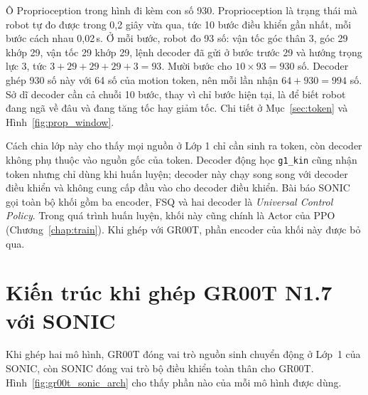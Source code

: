 \documentclass[12pt,a4paper,oneside]{report}
\newcommand{\code}[1]{\texttt{#1}}
\begin{document}
\begin{itemize}
\smallskip
Ô Proprioception trong hình đi kèm con số 930. Proprioception là trạng thái mà robot tự đo được trong 0,2 giây vừa qua, tức 10 bước điều khiển gần nhất, mỗi bước cách nhau 0,02\,s. Ở mỗi bước, robot đo 93 số: vận tốc góc thân 3, góc 29 khớp 29, vận tốc 29 khớp 29, lệnh decoder đã gửi ở bước trước 29 và hướng trọng lực 3, tức $3 + 29 + 29 + 29 + 3 = 93$. Mười bước cho $10 \times 93 = 930$ số. Decoder ghép 930 số này với 64 số của motion token, nên mỗi lần nhận $64 + 930 = 994$ số. Sở dĩ decoder cần cả chuỗi 10 bước, thay vì chỉ bước hiện tại, là để biết robot đang ngã về đâu và đang tăng tốc hay giảm tốc. Chi tiết ở Mục~\ref{sec:token} và Hình~\ref{fig:prop_window}.
\end{itemize}
Cách chia lớp này cho thấy mọi nguồn ở Lớp 1 chỉ cần sinh ra token, còn decoder không phụ thuộc vào nguồn gốc của token. Decoder động học \code{g1\_kin} cũng nhận token nhưng chỉ dùng khi huấn luyện; decoder này chạy song song với decoder điều khiển và không cung cấp đầu vào cho decoder điều khiển. Bài báo SONIC gọi toàn bộ khối gồm ba encoder, FSQ và hai decoder là \emph{Universal Control Policy}. Trong quá trình huấn luyện, khối này cũng chính là Actor của PPO (Chương~\ref{chap:train}). Khi ghép với GR00T, phần encoder của khối này được bỏ qua.

\section{Kiến trúc khi ghép GR00T N1.7 với SONIC}
\label{sec:intro_combine}

Khi ghép hai mô hình, GR00T đóng vai trò nguồn sinh chuyển động ở Lớp~1 của SONIC, còn SONIC đóng vai trò bộ điều khiển toàn thân cho GR00T. Hình~\ref{fig:gr00t_sonic_arch} cho thấy phần nào của mỗi mô hình được dùng.
\end{document}
